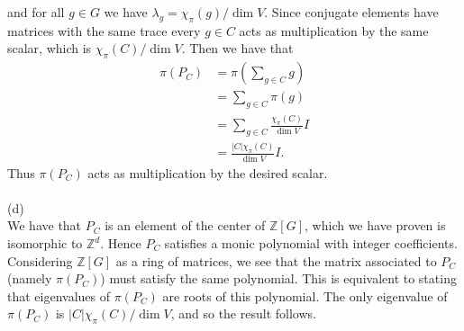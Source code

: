 \documentclass[11pt]{article}
\newcommand{\Z}{\mathbb{Z}}
\begin{document}
and for all $g\in G$ we have $\lambda_g = \chi_\pi(g)/\dim V$. Since conjugate elements have matrices with the same trace every $g\in C$ acts as multiplication by the same scalar, which is $\chi_\pi(C)/\dim V$. Then we have that \begin{align*}
\pi(P_C) &= \pi\left(\sum_{g\in C} g\right) \\
& = \sum_{g\in C} \pi(g)\\
& = \sum_{g\in C} \frac{\chi_\pi(C)}{\dim V} I\\
& = \frac{|C|\chi_\pi(C)}{\dim V} I.
\end{align*}
Thus $\pi(P_C)$ acts as multiplication by the desired scalar.\\\\
(d)\\
We have that $P_C$ is an element of the center of $\Z[G]$, which we have proven is isomorphic to $\Z^d$. Hence $P_C$ satisfies a monic polynomial with integer coefficients. Considering $\Z[G]$ as a ring of matrices, we see that the matrix associated to $P_C$ (namely $\pi(P_C)$) must satisfy the same polynomial. This is equivalent to stating that eigenvalues of $\pi(P_C)$ are roots of this polynomial. The only eigenvalue of $\pi(P_C)$ is $|C|\chi_\pi(C)/\dim V$, and so the result follows.
\end{document}

